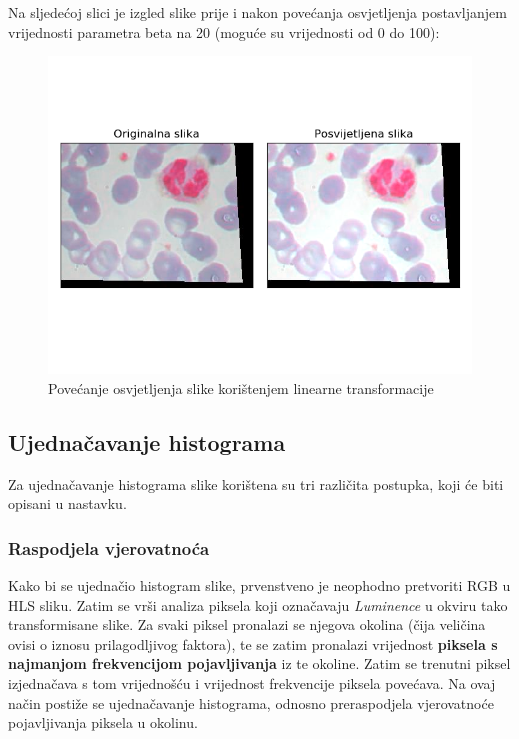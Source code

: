 \documentclass[12pt,a4paper]{article}
\begin{document}
Na sljedećoj slici je izgled slike prije i nakon povećanja osvjetljenja postavljanjem vrijednosti parametra beta na 20 (moguće su vrijednosti od 0 do 100):

\begin{figure}[H]

	\center
	\includegraphics[scale=0.9]{s6Osvjetljenje2.png}
	\caption{Povećanje osvjetljenja slike korištenjem linearne transformacije}
	
\end{figure}

\subsection{Ujednačavanje histograma}

Za ujednačavanje histograma slike korištena su tri različita postupka, koji će biti opisani u nastavku.

\subsubsection{Raspodjela vjerovatnoća}

Kako bi se ujednačio histogram slike, prvenstveno je neophodno pretvoriti RGB u HLS sliku. Zatim se vrši analiza piksela koji označavaju \textit{Luminence} u okviru tako transformisane slike. Za svaki piksel pronalazi se njegova okolina (čija veličina ovisi o iznosu prilagodljivog faktora), te se zatim pronalazi vrijednost \textbf{piksela s najmanjom frekvencijom pojavljivanja} iz te okoline. Zatim se trenutni piksel izjednačava s tom vrijednošću i vrijednost frekvencije piksela povećava. Na ovaj način postiže se ujednačavanje histograma, odnosno preraspodjela vjerovatnoće pojavljivanja piksela u okolinu. \\
\end{document}
